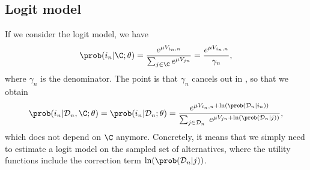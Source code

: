 \documentclass[12pt,a4paper]{article}
\begin{document}
\subsection{Logit model}
If we consider the logit model, we have
\[
\prob(i_n | \C; \theta) = \frac{e^{\mu V_{i_n,n}}}{\sum_{j\in\C} e^{\mu V_{jn}}} = \frac{e^{\mu V_{i_n,n}}}{\gamma_n},
\]
where $\gamma_n$ is the denominator. The point is that $\gamma_n$ cancels out in , so that we obtain
\begin{equation}
  \label{eq:logit}
  \prob(i_n | \mathcal{D}_n, \C; \theta) = \prob(i_n | \mathcal{D}_n; \theta) =\frac{e^{\mu V_{i_n,n} + \ln(\prob(\mathcal{D}_n | i_n) )} }{\sum_{j\in\mathcal{D}_n} \; e^{\mu V_{jn}+ \ln(\prob(\mathcal{D}_n | j))}},
    \end{equation}
which does not depend on $\C$ anymore. Concretely, it means that we simply need to estimate a logit model on the sampled set of alternatives, where the utility functions include the correction term $\ln(\prob(\mathcal{D}_n | j))$.
\end{document}
